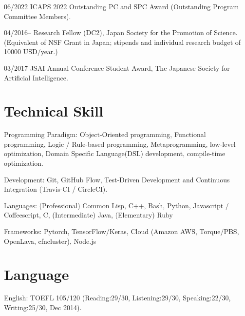 \documentclass[letterpaper,11pt]{article}
\begin{document}
\begin{CV}
 \item[06/2022] ICAPS 2022 Outstanding PC and SPC Award (Outstanding Program Committee Members).

 \item[04/2016--] Research Fellow (DC2), Japan Society for the Promotion of Science.
 (Equivalent of NSF Grant in Japan; stipends and individual research budget of 10000 USD/year.)
 \item[03/2017]
 JSAI Annual Conference Student Award, The Japanese Society for Artificial Intelligence.
\end{CV}

\section{Technical Skill}

\begin{CV}
 \item[Programming Paradigm:] %
 Object-Oriented programming,
 Functional programming,
 Logic / Rule-based programming,
 Metaprogramming, low-level optimization,
 Domain Specific Language(DSL) development, compile-time optimization.
 \item[Development:] Git, GitHub Flow, Test-Driven Development and Continuous Integration (Travis-CI / CircleCI).
 \item[Languages:]
 (Professional) Common Lisp, C++, Bash, Python, Javascript / Coffeescript, C,
 (Intermediate) Java,
 (Elementary)   Ruby
 \item[Frameworks:] Pytorch, TensorFlow/Keras, Cloud (Amazon AWS, Torque/PBS, OpenLava, cfncluster),
 Node.js%
\end{CV}

\section{Language}

\begin{CV}
 \item[English:] TOEFL 105/120 (Reading:29/30, Listening:29/30,
 Speaking:22/30, Writing:25/30, Dec 2014).
\end{CV}
\end{document}
